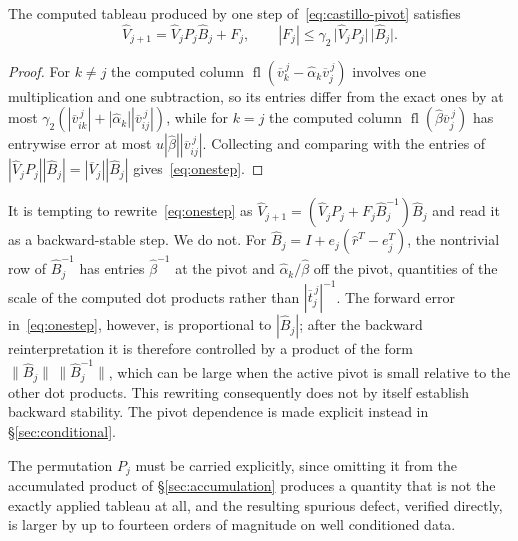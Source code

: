 \documentclass[review,onefignum,onetabnum]{siamart251216}
\newcommand{\fl}{\operatorname{fl}}
\begin{document}
\begin{lemma}\label{lem:onestep}
The computed tableau produced by one step of~\eqref{eq:castillo-pivot} satisfies
%
\begin{equation}\label{eq:onestep}
\widehat V_{j+1} = \widehat V_j P_j \widehat B_j + F_j,
\qquad
|F_j| \le \gamma_2\,\bigl|\widehat V_jP_j\bigr|\,\bigl|\widehat B_j\bigr| .
\end{equation}
\end{lemma}

\begin{proof}
For $k\ne j$ the computed column
$\fl(\overline v_k^{\,j}-\hat\alpha_k\overline v_j^{\,j})$ involves one multiplication and one
subtraction, so its entries differ from the exact ones by at most
$\gamma_2(|\overline v_{ik}^{\,j}|+|\hat\alpha_k||\overline v_{ij}^{\,j}|)$, while for $k=j$
the computed column $\fl(\hat\beta\overline v_j^{\,j})$ has entrywise error at most
$u|\hat\beta||\overline v_{ij}^{\,j}|$. Collecting and comparing with the entries of
$|\widehat V_jP_j||\widehat B_j|=|\overline V_j||\widehat B_j|$ gives~\eqref{eq:onestep}.
\end{proof}

\begin{remark}\label{rem:no-backward-step}
It is tempting to rewrite~\eqref{eq:onestep} as
$\widehat V_{j+1} = (\widehat V_jP_j + F_j\widehat B_j^{-1})\widehat B_j$ and read it as a
backward-stable step. We do not. For
$\widehat B_j=I+e_j(\hat r^T-e_j^T)$, the nontrivial row of $\widehat B_j^{-1}$ has entries
$\hat\beta^{-1}$ at the pivot and $\hat\alpha_k/\hat\beta$ off the pivot, quantities of the
scale of the computed dot products rather than $|\overline t_j^{\,j}|^{-1}$. The forward error
in~\eqref{eq:onestep}, however, is proportional to $|\widehat B_j|$; after the backward
reinterpretation it is therefore controlled by a product of the form
$\|\widehat B_j\|\,\|\widehat B_j^{-1}\|$, which can be large when the active pivot is small
relative to the other dot products. This rewriting consequently does not by itself establish
backward stability. The pivot dependence is made explicit instead in \S\ref{sec:conditional}.
\end{remark}

The permutation $P_j$ must be carried explicitly, since omitting it from the accumulated product of
\S\ref{sec:accumulation} produces a quantity that is not the exactly applied tableau at all,
and the resulting spurious defect, verified directly, is larger by up to fourteen orders
of magnitude on well conditioned data.
\end{document}
